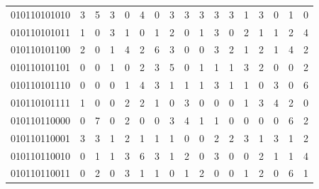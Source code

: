 \documentclass[10pt,a4paper]{article}
\begin{document}
\begin{longtable}{ |c|c|c|c|c|c|c|c|c|c|c|c|c|c|c|c|c| }
    010110101010              & 3                            & 5                                & 3                            & 0                              & 4   & 0   & 3   & 3   & 3   & 3   & 3   & 1   & 3   & 0   & 1   & 0   \\
    010110101011              & 1                            & 0                                & 3                            & 1                              & 0   & 1   & 2   & 0   & 1   & 3   & 0   & 2   & 1   & 1   & 2   & 4   \\
    010110101100              & 2                            & 0                                & 1                            & 4                              & 2   & 6   & 3   & 0   & 0   & 3   & 2   & 1   & 2   & 1   & 4   & 2   \\
    010110101101              & 0                            & 0                                & 1                            & 0                              & 2   & 3   & 5   & 0   & 1   & 1   & 1   & 3   & 2   & 0   & 0   & 2   \\
    010110101110              & 0                            & 0                                & 0                            & 1                              & 4   & 3   & 1   & 1   & 1   & 3   & 1   & 1   & 0   & 3   & 0   & 6   \\
    010110101111              & 1                            & 0                                & 0                            & 2                              & 2   & 1   & 0   & 3   & 0   & 0   & 0   & 1   & 3   & 4   & 2   & 0   \\
    010110110000              & 0                            & 7                                & 0                            & 2                              & 0   & 0   & 3   & 4   & 1   & 1   & 0   & 0   & 0   & 0   & 6   & 2   \\
    010110110001              & 3                            & 3                                & 1                            & 2                              & 1   & 1   & 1   & 0   & 0   & 2   & 2   & 3   & 1   & 3   & 1   & 2   \\
    010110110010              & 0                            & 1                                & 1                            & 3                              & 6   & 3   & 1   & 2   & 0   & 3   & 0   & 0   & 2   & 1   & 1   & 4   \\
    010110110011              & 0                            & 2                                & 0                            & 3                              & 1   & 1   & 0   & 1   & 2   & 0   & 0   & 1   & 2   & 0   & 6   & 1   \\

\end{longtable}
\end{document}
